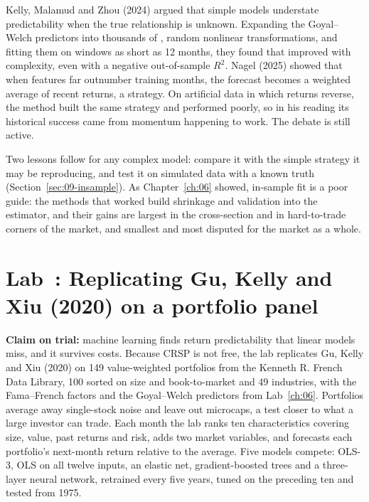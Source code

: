 Kelly, Malamud and Zhou (2024) argued that simple models understate predictability when the true relationship is unknown. Expanding the Goyal--Welch predictors into thousands of , random nonlinear transformations, and fitting them on windows as short as 12 months, they found that  improved with complexity, even with a negative out-of-sample $R^2$. Nagel (2025) showed that when features far outnumber training months, the forecast becomes a weighted average of recent returns, a  strategy. On artificial data in which returns reverse, the method built the same strategy and performed poorly, so in his reading its historical success came from momentum happening to work. The debate is still active.

Two lessons follow for any complex model: compare it with the simple strategy it may be reproducing, and test it on simulated data with a known truth (Section~\ref{sec:09-insample}). As Chapter~\ref{ch:06} showed, in-sample fit is a poor guide: the methods that worked build shrinkage and validation into the estimator, and their gains are largest in the cross-section and in hard-to-trade corners of the market, and smallest and most disputed for the market as a whole.

\section{Lab~\thechapter: Replicating Gu, Kelly and Xiu (2020) on a portfolio panel}
\label{sec:20-lab}

\textbf{Claim on trial:} machine learning finds return predictability that linear models miss, and it survives costs. Because CRSP is not free, the lab replicates Gu, Kelly and Xiu (2020) on 149 value-weighted portfolios from the Kenneth R. French Data Library, 100 sorted on size and book-to-market and 49 industries, with the Fama--French factors and the Goyal--Welch predictors from Lab~\ref{ch:06}. Portfolios average away single-stock noise and leave out microcaps, a test closer to what a large investor can trade. Each month the lab ranks ten characteristics covering size, value, past returns and risk, adds two market variables, and forecasts each portfolio's next-month return relative to the average. Five models compete: OLS-3, OLS on all twelve inputs, an elastic net, gradient-boosted trees and a three-layer neural network, retrained every five years, tuned on the preceding ten and tested from 1975.

